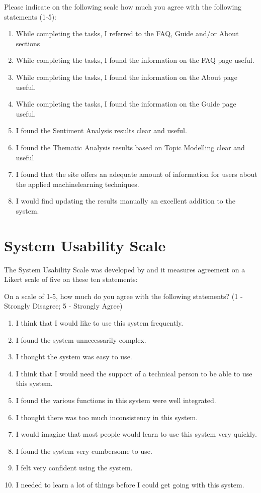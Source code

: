 \documentclass{l4proj}
\begin{document}
\begin{appendices}
Please indicate on the following scale how much you agree with the
following statements (1-5):
\begin{enumerate}
    \item While completing the tasks, I referred to the FAQ, Guide and/or About sections
    \item While completing the tasks, I found the information on the FAQ page useful.
    \item While completing the tasks, I found the information on the About page useful.
    \item While completing the tasks, I found the information on the Guide page useful.
    \item I found the Sentiment Analysis results clear and useful.
    \item I found the Thematic Analysis results based on Topic Modelling clear and useful
    \item I found that the site offers an adequate amount of information for users about the applied machinelearning techniques.
    \item I would find updating the results manually an excellent addition to the system.
\end{enumerate}
 
\section{System Usability Scale}
The System Usability Scale was developed by \cite{brooke1996sus} and it measures agreement on a Likert scale of five on these ten statements:

On a scale of 1-5, how much do you agree with the following
statements? (1 - Strongly Disagree; 5 - Strongly Agree)
\begin{enumerate}
    \item I think that I would like to use this system frequently.
    \item I found the system unnecessarily complex.
    \item I thought the system was easy to use.
    \item I think that I would need the support of a technical person to be able to use this system.
    \item I found the various functions in this system were well integrated.
    \item I thought there was too much inconsistency in this system.
    \item I would imagine that most people would learn to use this system very quickly.
    \item I found the system very cumbersome to use.
    \item I felt very confident using the system.
    \item I needed to learn a lot of things before I could get going with this system.
\end{enumerate}


\end{appendices}
\end{document}
